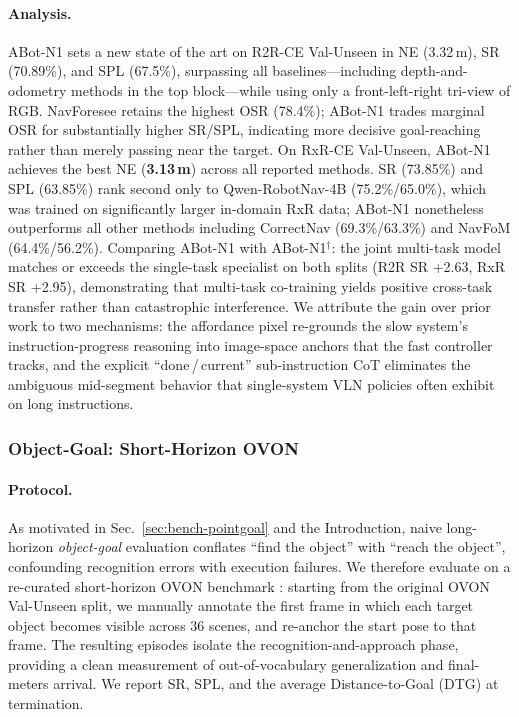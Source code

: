 \paragraph{Analysis.}
ABot-N1 sets a new state of the art on R2R-CE Val-Unseen in NE
(3.32\,m), SR (70.89\%), and SPL
(67.5\%), surpassing all baselines---including
depth-and-odometry methods in the top block---while using only a
front-left-right tri-view of RGB. NavForesee retains the highest OSR (78.4\%); ABot-N1
trades marginal OSR for substantially higher SR/SPL, indicating more
decisive goal-reaching rather than merely passing near the target.
On RxR-CE Val-Unseen, ABot-N1 achieves the best NE (\textbf{3.13\,m})
across all reported methods. SR (73.85\%) and SPL (63.85\%) rank second
only to Qwen-RobotNav-4B (75.2\%/65.0\%), which was trained on
significantly larger in-domain RxR data; ABot-N1 nonetheless
outperforms all other methods including CorrectNav (69.3\%/63.3\%)
and NavFoM (64.4\%/56.2\%).
Comparing ABot-N1 with ABot-N1$^\dagger$: the joint multi-task model
matches or exceeds the single-task specialist on both splits (R2R SR
+2.63, RxR SR +2.95), demonstrating that multi-task co-training
yields positive cross-task transfer rather than catastrophic
interference.
We attribute the gain over prior work to two mechanisms: the
affordance pixel re-grounds the slow system's instruction-progress
reasoning into image-space anchors that the fast controller
tracks, and the explicit
``done\,/\,current'' sub-instruction CoT eliminates the
ambiguous mid-segment behavior that single-system VLN policies often
exhibit on long instructions.

\FloatBarrier
\subsubsection{Object-Goal: Short-Horizon OVON}
\label{sec:exp-objgoal}

\paragraph{Protocol.}
As motivated in Sec.~\ref{sec:bench-pointgoal} and the
Introduction, naive long-horizon \textit{object-goal} evaluation conflates
``find the object'' with ``reach the object'', confounding
recognition errors with execution failures. We therefore evaluate
on a re-curated short-horizon OVON benchmark \cite{yokoyama2024hmovon}: starting from the
original OVON Val-Unseen split, we manually annotate the first
frame in which each target object becomes visible across 36
scenes, and re-anchor the start pose to that frame. The resulting
episodes isolate the recognition-and-approach phase, providing a
clean measurement of out-of-vocabulary generalization and
final-meters arrival. We report SR, SPL, and the average
Distance-to-Goal (DTG) at termination.

